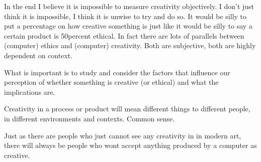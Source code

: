 \begin{draft}
  In the end I believe it is impossible to measure creativity objectively. I don’t just think it is impossible, I think it is unwise to try and do so. It would be silly to put a percentage on how creative something is just like it would be silly to say a certain product is 50percent ethical. In fact there are lots of parallels between (computer) ethics and (computer) creativity. Both are subjective, both are highly dependent on context.

  What is important is to study and consider the factors that influence our perception of whether something is creative (or ethical) and what the implications are.

  Creativity in a process or product will mean different things to different people, in different environments and contexts.
  Common sense.

  Just as there are people who just cannot see any creativity in in modern art, there will always be people who wont accept anything produced by a computer as creative.
\end{draft}

